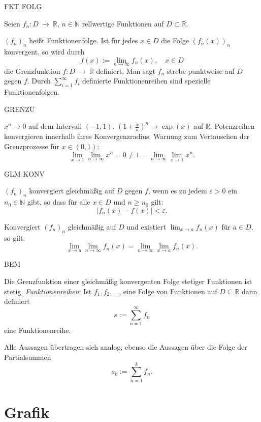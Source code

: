 \documentclass[fontsize=12pt,paper=a4,twoside,bibtotoc,idxtotoc,
liststotoc,pagesize,BCOR1.2cm,DIV15,chapterprefix,pagesize=pdftex]{scrbook}
\theoremstyle{plain}
\theoremstyle{definition}
\theoremstyle{remark}
\begin{document}
FKT FOLG

Seien $f_n: D \ \rightarrow \ \mathbb{R}$, $n \in
\mathbb{N}$  rellwertige Funktionen auf  $D \subset \mathbb{R}$.

 $(f_n)_n$ heißt {\color{red} Funktionenfolge.}
 Ist für jedes $x\in D$ die Folge $(f_n(x))_n$ konvergent, so wird durch 
\[ f(x):= \lim_{n \rightarrow \infty} f_n(x), \quad x \in D \]
die {\color{red} Grenzfunktion} $f:D \ \rightarrow \ \mathbb{R}$ definiert.
 Man sagt $f_n$ strebe {\color{red} punktweise} auf $D$ gegen $f$.  
 Durch $\sum_{i=1}^\infty f_i$ definierte {\color{red} Funktionenreihen}
sind spezielle Funktionenfolgen.
  

GRENZÜ


 $x^n \rightarrow 0$ auf dem Intervall $(-1,1)$.
 $\left( 1+ \frac{x}{n} \right)^n \rightarrow \exp(x)$ auf $\mathbb{R}$.
 Potenzreihen konvergieren innerhalb ihres Konvergenzradius.
 {\color{red} Warnung} zum Vertauschen der Grenzprozesse für $x \in (0,1)$:
\[ \lim_{x \rightarrow 1} \lim_{n \rightarrow \infty} x^n =0 \neq 1 = 
  \lim_{n \rightarrow \infty} \lim_{x \rightarrow 1} x^n.\]  


GLM KONV


$(f_n)_n$ konvergiert {\color{red} gleichmäßig} auf $D$ gegen $f$, wenn es zu
jedem $\varepsilon >0$ ein $n_0 \in \mathbb{N}$ gibt, so dass für alle
$x \in D$ und $n\geq n_0$ gilt:
\[ |f_n(x) -f(x)| < \varepsilon.\]



 Konvergiert $(f_n)_n$ gleichmäßig auf $D$ und existiert $\lim_{x
\rightarrow a} f_n(x)$ für $a\in D$, so gilt:
\[ \lim_{x \rightarrow a} \lim_{n \rightarrow \infty} f_n(x) = \lim_{n
\rightarrow \infty} \lim_{x \rightarrow a} f_n(x). \]


BEM


 Die Grenzfunktion einer gleichmäßig konvergenten Folge stetiger
Funktionen ist stetig.
 \emph{Funktionenreihen}: Ist $f_1, f_2, \ldots$, eine Folge von Funktionen auf $D \subseteq \mathbb{R}$ dann definiert
\[
 s := \sum_{n=1}^\infty f_n
\]
eine Funktionenreihe. 

Alle Aussagen übertragen sich analog; ebenso die Aussagen über die Folge der Partialsummen
\[
 s_k := \sum_{n=1}^k f_n.
\]
 
 


\section{Grafik}
\end{document}
